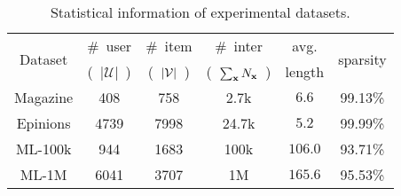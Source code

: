 \def\arraystretch{1.1}
\begin{table}[htbp]
    \caption{Statistical information of experimental datasets.}
    \vspace{-8pt}
    \label{tab:data_stats}
    \begin{center}
        \begin{tabular}{c | c c c c c}
            \toprule
            
            \multirow{2}{*}{Dataset} & \#~user & \#~item & \#~inter & avg. & \multirow{2}{*}{sparsity} \\
            & (~$|\mathcal{U}|$~) & (~$|\mathcal{V}|$~) & (~$\sum_{\mathbf{x}}N_{\mathbf{x}}$~) & length \\
            
            \midrule

            {Magazine}    & 408  & 758  & 2.7k  & $6.6$   & 99.13\% \\
            {Epinions}    & 4739 & 7998 & 24.7k & $5.2$   & 99.99\% \\
            {ML-100k}     & 944  & 1683 & 100k  & $106.0$ & 93.71\% \\
            {ML-1M}       & 6041 & 3707 & 1M    & $165.6$ & 95.53\% \\
            
            \bottomrule
        \end{tabular}
    \end{center}
\end{table}
